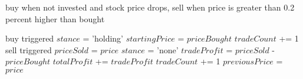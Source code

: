 \documentclass{article}
\begin{document}
	\begin{algorithm}
		\caption{buy when not invested and stock price drops, sell when price is greater than 0.2 percent higher than bought}
		\label{macd}
		\begin{algorithmic}[1]
					\State buy triggered
					\State $stance$ = 'holding'
						\State $startingPrice$ = $priceBought$
					\EndIf
					\State $tradeCount$ += 1
				\EndIf
					\State sell triggered
					\State $priceSold$ = $price$
					\State $stance$ = 'none'
					\State $tradeProfit$ = $priceSold$ - $priceBought$
					\State $totalProfit$ += $tradeProfit$
					\State $tradeCount$ += 1
				\EndIf
			\EndIf
			\State $previousPrice$ = $price$			
		\end{algorithmic}
	\end{algorithm}
\end{document}
